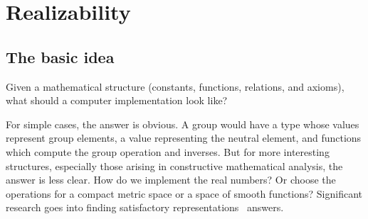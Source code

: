 \chapter{Realizability}
\label{chap:realizability}

\section{The basic idea}
\label{sec:realizability-basic-idea}

Given a mathematical structure (constants, functions, relations, and
axioms), what should a computer implementation look like?

For simple cases, the answer is obvious. A group would have a type
whose values represent group elements, a value representing the
neutral element, and functions which compute the group operation and
inverses. But for more interesting structures, especially those
arising in constructive mathematical analysis, the answer is less
clear. How do we implement the real numbers? Or choose the operations
for a compact metric space or a space of smooth functions? Significant
research goes into finding satisfactory
representations~\cite{Wei00,TZ98,Bla97,edalat04:_domain_theor_differ_calcul_funct}
answers.

